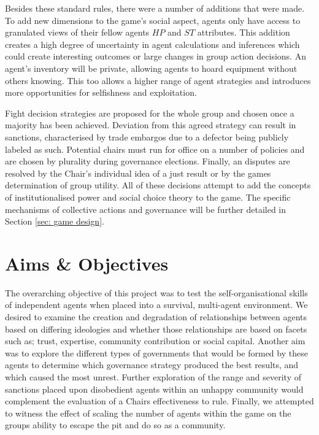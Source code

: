 Besides these standard rules, there were a number of additions that were made. To add new dimensions to the game's social aspect, agents only have access to granulated views of their fellow agents $HP$ and $ST$ attributes. This addition creates a high degree of uncertainty in agent calculations and inferences which could create interesting outcomes or large changes in group action decisions. An agent's inventory will be private, allowing agents to hoard equipment without others knowing. This too allows a higher range of agent strategies and introduces more opportunities for selfishness and exploitation. 

Fight decision strategies are proposed for the whole group and chosen once a majority has been achieved. Deviation from this agreed strategy can result in sanctions, characterised by trade embargos due to a defector being publicly labeled as such. Potential chairs must run for office on a number of policies and are chosen by plurality during governance elections. Finally, an disputes are resolved by the Chair's individual idea of a just result or by the games determination of group utility. All of these decisions attempt to add the concepts of institutionalised power and social choice theory to the game. The specific mechanisms of collective actions and governance will be further detailed in Section \ref{sec: game design}. 


\section{Aims \& Objectives}\label{sec:aims}

The overarching objective of this project was to test the self-organisational skills of independent agents when placed into a survival, multi-agent environment. We desired to examine the creation and degradation of relationships between agents based on differing ideologies and whether those relationships are based on facets such as; trust, expertise, community contribution or social capital. Another aim was to explore the different types of governments that would be formed by these agents to determine which governance strategy produced the best results, and which caused the most unrest. Further exploration of the range and severity of sanctions placed upon disobedient agents within an unhappy community would complement the evaluation of a Chairs effectiveness to rule. Finally, we attempted to witness the effect of scaling the number of agents within the game on the groups ability to escape the pit and do so as a community. 

